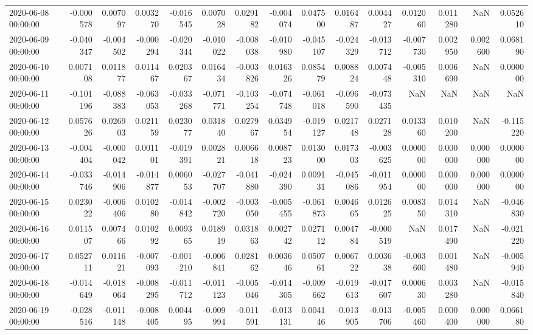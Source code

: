 \begin{tabular}{lrrrrrrrrrrrrrr}
2020-06-08 00:00:00 & -0.000578 & 0.007097 & 0.003270 & -0.016545 & 0.007028 & 0.029182 & -0.004074 & 0.047500 & 0.016487 & 0.004427 & 0.012060 & 0.011280 & NaN & 0.052610 \\
2020-06-09 00:00:00 & -0.040347 & -0.004502 & -0.000294 & -0.020344 & -0.010022 & -0.008038 & -0.010980 & -0.045107 & -0.024329 & -0.013712 & -0.007730 & 0.002950 & 0.002600 & 0.068190 \\
2020-06-10 00:00:00 & 0.007108 & 0.011877 & 0.011467 & 0.020367 & 0.016434 & -0.003826 & 0.016326 & 0.085479 & 0.008824 & 0.007448 & -0.005310 & 0.006690 & NaN & 0.000000 \\
2020-06-11 00:00:00 & -0.101196 & -0.088383 & -0.063053 & -0.033268 & -0.071771 & -0.103254 & -0.074748 & -0.061018 & -0.096590 & -0.073435 & NaN & NaN & NaN & NaN \\
2020-06-12 00:00:00 & 0.057626 & 0.026903 & 0.021159 & 0.023077 & 0.031840 & 0.027967 & 0.034954 & -0.019127 & 0.021748 & 0.027128 & 0.013360 & 0.010200 & NaN & -0.115220 \\
2020-06-13 00:00:00 & -0.004404 & -0.000042 & 0.001101 & -0.019391 & 0.002821 & 0.006618 & 0.008723 & 0.013000 & 0.017303 & -0.003625 & 0.000000 & 0.000000 & 0.000000 & 0.000000 \\
2020-06-14 00:00:00 & -0.033746 & -0.014906 & -0.014877 & 0.006053 & -0.027707 & -0.041880 & -0.024390 & 0.009131 & -0.045086 & -0.011954 & 0.000000 & 0.000000 & 0.000000 & 0.000000 \\
2020-06-15 00:00:00 & 0.023022 & -0.006406 & 0.010280 & -0.014842 & -0.002720 & -0.003050 & -0.005455 & -0.061873 & 0.004665 & 0.012625 & 0.008350 & 0.014310 & NaN & -0.046830 \\
2020-06-16 00:00:00 & 0.011507 & 0.007466 & 0.010292 & 0.009365 & 0.018919 & 0.031863 & 0.002742 & 0.027112 & 0.004784 & -0.000519 & NaN & 0.017490 & NaN & -0.021220 \\
2020-06-17 00:00:00 & 0.052711 & 0.011621 & -0.007093 & -0.001210 & -0.006841 & 0.028162 & 0.003646 & 0.050761 & 0.006722 & 0.003638 & -0.003600 & 0.001480 & NaN & -0.005940 \\
2020-06-18 00:00:00 & -0.014649 & -0.018064 & -0.008295 & -0.011712 & -0.011123 & -0.005046 & -0.014305 & -0.009662 & -0.019613 & -0.017607 & 0.000630 & 0.003280 & NaN & -0.015840 \\
2020-06-19 00:00:00 & -0.028516 & -0.011148 & -0.008405 & 0.004495 & -0.009994 & -0.011591 & -0.013131 & 0.004146 & -0.013905 & -0.013706 & -0.005460 & 0.000400 & 0.000000 & 0.066180 \\

\end{tabular}
